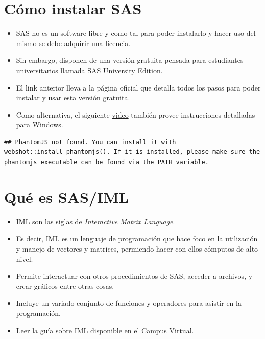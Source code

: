 \documentclass[]{book}
\providecommand{\tightlist}{%
  \setlength{\itemsep}{0pt}\setlength{\parskip}{0pt}}
\begin{document}
\hypertarget{como-instalar-sas}{%
\section{Cómo instalar SAS}\label{como-instalar-sas}}

\begin{itemize}
\tightlist
\item
  SAS no es un software libre y como tal para poder instalarlo y hacer uso del mismo se debe adquirir una licencia.
\item
  Sin embargo, disponen de una versión gratuita pensada para estudiantes universitarios llamada \href{https://www.sas.com/en_us/software/university-edition.html}{SAS University Edition}.
\item
  El link anterior lleva a la página oficial que detalla todos los pasos para poder instalar y usar esta versión gratuita.
\item
  Como alternativa, el siguiente \href{https://www.youtube.com/watch?v=932o9X-8QzM}{video} también provee instrucciones detalladas para Windows.
\end{itemize}

\begin{verbatim}
## PhantomJS not found. You can install it with webshot::install_phantomjs(). If it is installed, please make sure the phantomjs executable can be found via the PATH variable.
\end{verbatim}

\hypertarget{que-es-sasiml}{%
\section{Qué es SAS/IML}\label{que-es-sasiml}}

\begin{itemize}
\tightlist
\item
  IML son las siglas de \emph{Interactive Matrix Language}.
\item
  Es decir, IML es un lenguaje de programación que hace foco en la utilización y manejo de vectores y matrices, permiendo hacer con ellos cómputos de alto nivel.
\item
  Permite interactuar con otros procedimientos de SAS, acceder a archivos, y crear gráficos entre otras cosas.
\item
  Incluye un variado conjunto de funciones y operadores para asistir en la programación.
\item
  Leer la guía sobre IML disponible en el Campus Virtual.
\end{itemize}
\end{document}
